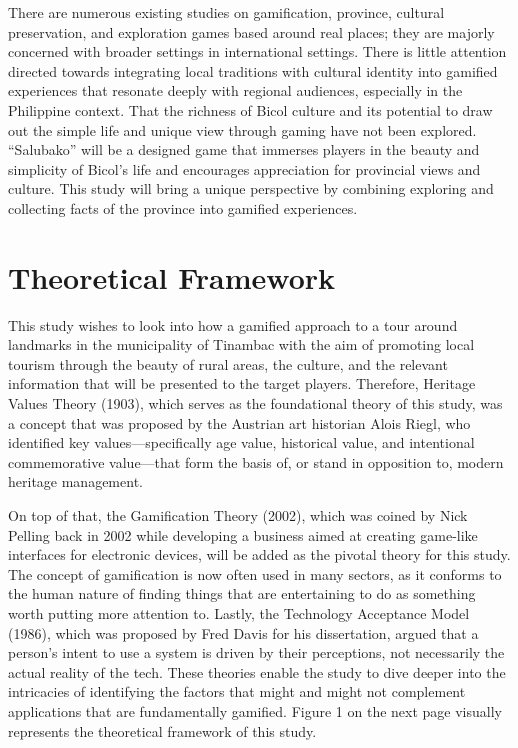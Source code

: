 \documentclass[11pt]{research}
\begin{document}
There are numerous existing studies on gamification, province, cultural preservation, and exploration games based around real places; they are majorly concerned with broader settings in international settings. There is little attention directed towards integrating local traditions with cultural identity into gamified experiences that resonate deeply with regional audiences, especially in the Philippine context. That the richness of Bicol culture and its potential to draw out the simple life and unique view through gaming have not been explored. “Salubako” will be a designed game that immerses players in the beauty and simplicity of Bicol’s life and encourages appreciation for provincial views and culture. This study will bring a unique perspective by combining exploring and collecting facts of the province into gamified experiences.

\section{Theoretical Framework}
This study wishes to look into how a gamified approach to a tour around landmarks in the municipality of Tinambac with the aim of promoting local tourism through the beauty of rural areas, the culture, and the relevant information that will be presented to the target players. Therefore, Heritage Values Theory (1903), which serves as the foundational theory of this study, was a concept that was proposed by the Austrian art historian Alois Riegl, who identified key values—specifically age value, historical value, and intentional commemorative value—that form the basis of, or stand in opposition to, modern heritage management. 

On top of that, the Gamification Theory (2002), which was coined by Nick Pelling back in 2002 while developing a business aimed at creating game-like interfaces for electronic devices, will be added as the pivotal theory for this study. The concept of gamification is now often used in many sectors, as it conforms to the human nature of finding things that are entertaining to do as something worth putting more attention to. Lastly, the Technology Acceptance Model (1986), which was proposed by Fred Davis for his dissertation, argued that a person’s intent to use a system is driven by their perceptions, not necessarily the actual reality of the tech.  These theories enable the study to dive deeper into the intricacies of identifying the factors that might and might not complement applications that are fundamentally gamified. Figure 1 on the next page visually represents the theoretical framework of this study.
\end{document}
